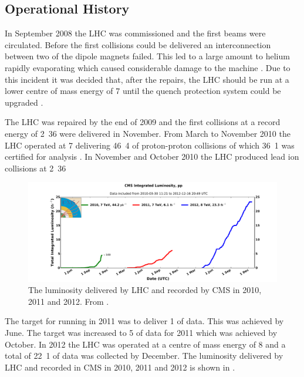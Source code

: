 \subsection{Operational History}
In September 2008 the {LHC} was commissioned and the first beams were
circulated.  Before the first collisions could be delivered an interconnection
between two of the dipole magnets failed. This led to
a large amount to helium rapidly evaporating which caused considerable damage to
the machine \cite{lebrun2009sector}.  Due to this incident it was decided that,
after the repairs,
the {LHC} should be run at a lower centre of mass energy of \unit{7}{\TeV} until
the quench protection system could be upgraded \cite{myers2010lhc}.

The {LHC} was repaired by the end of 2009 and the first collisions at a record
energy of \unit{2.36}{\TeV} were delivered in November.  From March to November
2010 the {LHC} operated at \unit{7}{\TeV} delivering \unit{46.4}{\invpb} of
proton-proton collisions of which \unit{36.1}{\invpb} was certified for analysis
\cite{myers1990design}.  In November and October 2010 the {LHC} produced lead
ion collisions at \unit{2.36}{\TeV}

\begin{figure}[htbp]
  \centering
  \includegraphics[width=\textwidth]{int_lumi_cumulative_pp_1}
  \caption{The luminosity delivered by LHC and recorded by CMS in 2010, 2011 and
2012. From \cite{intlumi}.}
  \label{fig:LHC2010}
\end{figure}

The target for running in 2011 was to deliver \unit{1}{\invfb} of data. This was
achieved by June. The target was increased to \unit{5}{\invfb} of data for 2011 which was achieved by October. 
In 2012 the {LHC} was operated at a centre of mass energy of \unit{8}{\TeV}
and a total of \unit{22.1}{\invfb} of data was collected by December.
The luminosity delivered by LHC and recorded in CMS in 2010, 2011 and 2012 is
shown in  \cite{intlumi}.

